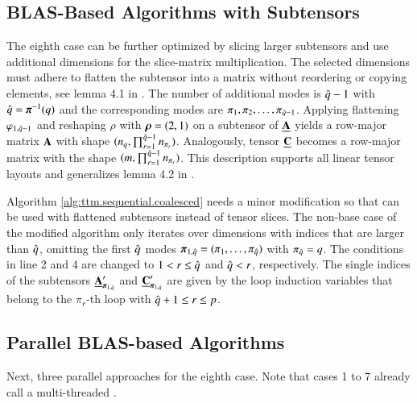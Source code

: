 \subsection{BLAS-Based Algorithms with Subtensors}
\label{sec:design:blas.based.algorithm.subtensors}
The eighth case can be further optimized by slicing larger subtensors and use additional dimensions for the slice-matrix multiplication.
The selected dimensions must adhere to flatten the subtensor into a matrix without reordering or copying elements, see lemma 4.1 in \cite{li:2015:input}.
The number of additional modes is $\hat{q}-1$ with $\hat{q} = \boldsymbol{\pi}^{-1}(q)$ and the corresponding modes are $\pi_1,\pi_2,\dots,\pi_{\hat{q}-1}$.
Applying flattening $\varphi_{1,\hat{q}-1}$ and reshaping $\rho$ with $\boldsymbol{\rho} = (2,1)$ on a subtensor of $\underline{\mathbf{A}}$ yields a row-major matrix $\mathbf{A}$ with shape $(n_q,\prod_{r=1}^{\hat{q}-1} n_{\pi_r})$.
Analogously, tensor $\underline{\mathbf{C}}$ becomes a row-major matrix with the shape $(m, \prod_{r=1}^{\hat{q}-1} n_{\pi_r})$.
This description supports all linear tensor layouts and generalizes lemma 4.2 in \cite{li:2015:input}.

Algorithm \ref{alg:ttm.sequential.coalesced} needs a minor modification so that  can be used with flattened subtensors instead of tensor slices.
The non-base case of the modified algorithm only iterates over dimensions with indices that are larger than $\hat{q}$, omitting the first $\hat{q}$ modes $\boldsymbol{\pi}_{1,\hat{q}} = (\pi_1, \dots, \pi_{\hat{q}})$ with $\pi_{\hat{q}} = q$.
The conditions in line 2 and 4 are changed to $1 < r \leq \hat{q}$ and $\hat{q} < r$, respectively.
The single indices of the subtensors $\underline{\mathbf{A}}_{\boldsymbol{\pi}_{1,\hat{q}}}'$ and $\underline{\mathbf{C}}_{\boldsymbol{\pi}_{1,\hat{q}}}'$ are given by the loop induction variables that belong to the $\pi_r$-th loop with $\hat{q}+1 \leq r \leq p$.  
 
\subsection{Parallel BLAS-based Algorithms}
\label{subsec:parallel.multi-loops}
Next, three parallel approaches for the eighth case.
Note that cases 1 to 7 already call a multi-threaded .

